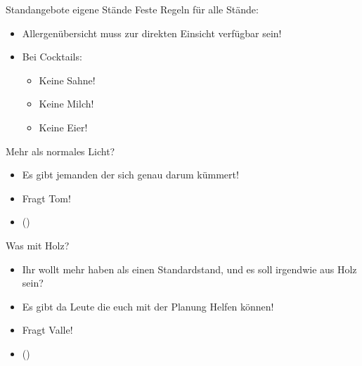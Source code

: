 \begin{frame}[c]{Standangebote eigene Stände}
    Feste Regeln für alle Stände:
    \begin{itemize}[<+(1)->]
        \item Allergenübersicht muss zur direkten Einsicht verfügbar sein!
        \item Bei Cocktails:
            \begin{itemize}[<+(1)->]
                \item Keine Sahne!
                \item Keine Milch!
                \item Keine Eier!
            \end{itemize}
    \end{itemize}
\end{frame}



\begin{frame}[c]{Mehr als normales Licht?}
    \begin{itemize}[<+(1)->]
        \item Es gibt jemanden der sich genau darum kümmert!
        \item Fragt Tom!
        \item ()
    \end{itemize}
\end{frame}


\begin{frame}[c]{Was mit Holz?}
    \begin{itemize}[<+(1)->]
        \item Ihr wollt mehr haben als einen Standardstand, und es soll irgendwie aus Holz sein?
        \item Es gibt da Leute die euch mit der Planung Helfen können!
        \item Fragt Valle!
        \item ()
    \end{itemize}
\end{frame}






